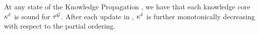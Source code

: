 \begin{theorem}
    \label{the:soundnessKnowledgePropagation}
    At any state of the Knowledge Propagation , we have that each knowledge core $\kappa^{\tilde{e}}$ is sound for $\tau^{\mathcal{G}}$.
    After each update in , $\kappa^{\tilde{e}}$ is further monotonically decreasing with respect to the partial ordering.
\end{theorem}
